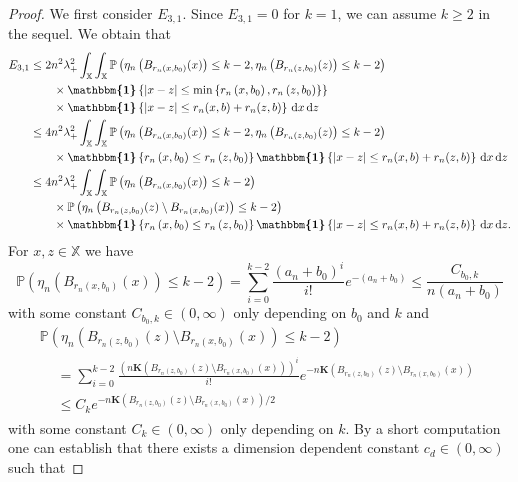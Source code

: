 \documentclass[AHL,Unicode,longabstracts]{cedram}
\newcommand*\bK{\mathbf{K}}
\renewcommand*\P{\mathbb{P}}
\newcommand*\X{\mathbb{X}}
\newcommand*\md{\mathrm{d}}
\newcommand{\ind}{\boldsymbol{\mathbbm{1}}}
\newcommand{\set}[1]{\left\{#1\right\}}
\newcommand{\prob}[1]{\P\left(#1\right)}
\begin{document}
\begin{proof}
We first consider $E_{3,1}$. Since $E_{3,1}=0$ for $k=1$, we can assume $k\geq 2$ in the sequel. We obtain that
\begin{align*}
E_{3,1} & \leq {2} n^2 \lambda_+^2 \int_{\X}\int_{\X} \prob{\eta_n \left(B_{r_n\left(x,b_0\right)}(x)\right) \leq k-2, \eta_n \left(B_{r_n\left(z,b_0\right)}(z)\right) \leq k-2} \\
& \qquad \times \ind\set{|x-z|\leq \min
\left\{r_n\left(x,b_0\right),r_n\left(z,b_0\right)\right\}}\\
&\qquad \times  \ind\set{|x-z| \leq r_n(x,b) + r_n(z,b)} \, \md x \, \md z \\
& \leq {4} n^2 \lambda_+^2 \int_{\X}\int_{\X} \prob{\eta_n \left(B_{r_n\left(x,b_0\right)}(x)\right) \leq k-2, \eta_n \left(B_{r_n\left(z,b_0\right)}(z)\right) \leq k-2} \\
& \qquad\times \ind\set{r_n\left(x,b_0\right) \leq r_n\left(z,b_0\right)} \ind\set{|x-z| \leq r_n(x,b) + r_n(z,b)} \, \md x \, \md z \\
& \leq {4} n^2 \lambda_+^2 \int_{\X}\int_{\X} \prob{\eta_n \left(B_{r_n\left(x,b_0\right)}(x)\right) \leq k-2} \\
&\qquad \times\prob{\eta_n \left(B_{r_n\left(z,b_0\right)}(z)\setminus B_{r_n\left(x,b_0\right)}(x)\right) \leq k-2} \\
& \qquad\times \ind\set{r_n\left(x,b_0\right) \leq r_n\left(z,b_0\right)} \ind\set{|x-z| \leq r_n(x,b) + r_n(z,b)} \, \md x \, \md z.
\end{align*}
For $x,z\in\X$ we have
\[
\prob{\eta_n \left(B_{r_n\left(x,b_0\right)}(x)\right) \leq k-2} =\sum_{i=0}^{k-2} \frac{\left(a_n+b_0\right)^i}{i!} e^{-\left(a_n+b_0\right)} \leq \frac{C_{b_0,k}}{n\left(a_n+b_0\right)}
\]
with some constant $C_{b_0,k}\in (0,\infty)$ only depending on $b_0$ and $k$ and
\begin{multline*}
 \prob{ \eta_n \left(B_{r_n\left(z,b_0\right)}(z)\setminus B_{r_n\left(x,b_0\right)}(x)\right) \leq k-2} \\
\begin{aligned}
& = \sum_{i=0}^{k-2} \frac{\left(n\bK\left(B_{r_n\left(z,b_0\right)}(z)\setminus B_{r_n\left(x,b_0\right)}(x)\right)\right)^i}{i!} e^{-n\bK\left(B_{r_n\left(z,b_0\right)}(z)\setminus B_{r_n\left(x,b_0\right)}(x)\right)} \\
& \leq C_k e^{-n\bK\left(B_{r_n\left(z,b_0\right)}(z)\setminus B_{r_n\left(x,b_0\right)}(x)\right)/2}
\end{aligned}
\end{multline*}
with some constant $C_k\in(0,\infty)$ only depending on $k$. By a short computation one can establish that there exists a dimension dependent constant $c_d\in(0,\infty)$ such that

\end{proof}
\end{document}
